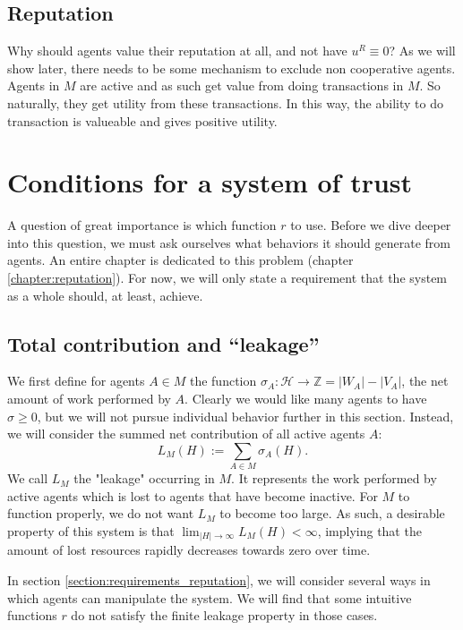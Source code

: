\subsection{Reputation}
Why should agents value their reputation at all, 
and not have $u^R \equiv 0$? 
As we will show later, 
there needs to be some mechanism to exclude non cooperative agents. 
Agents in $M$ are active and as such get value from doing transactions in $M$. 
So naturally, they get utility from these transactions. 
In this way, the ability to do transaction is valueable and gives positive utility.

\section{Conditions for a system of trust}
A question of great importance is which function $r$ to use. 
Before we dive deeper into this question, 
we must ask ourselves what behaviors it should generate from agents. 
An entire chapter is dedicated to this problem (chapter \ref{chapter:reputation}). 
For now, we will only state a requirement that the system as a whole should, at least, achieve.

\subsection{Total contribution and ``leakage''}
We first define for agents $A \in M$ the function $\sigma_A: \mathcal{H} \to \mathds{Z} = |W_A| - |V_A|$, the net amount of work performed by $A$. 
Clearly we would like many agents to have $\sigma \geq 0$, 
but we will not pursue individual behavior further in this section. 
Instead, we will consider the summed net contribution of all active agents $A$:
\[L_M(H) := \sum_{A \in M} \sigma_A(H).\]
We call $L_M$ the "leakage" occurring in $M$. 
It represents the work performed by active agents which is lost to agents that have become inactive. 
For $M$ to function properly, 
we do not want $L_M$ to become too large. 
As such, a desirable property of this system is that $\lim_{|H| \to \infty} L_M(H) < \infty$, 
implying that the amount of lost resources rapidly decreases towards zero over time. 

In section \ref{section:requirements_reputation}, we will consider several ways in which agents can manipulate the system. 
We will find that some intuitive functions $r$ do not satisfy the finite leakage property in those cases.


